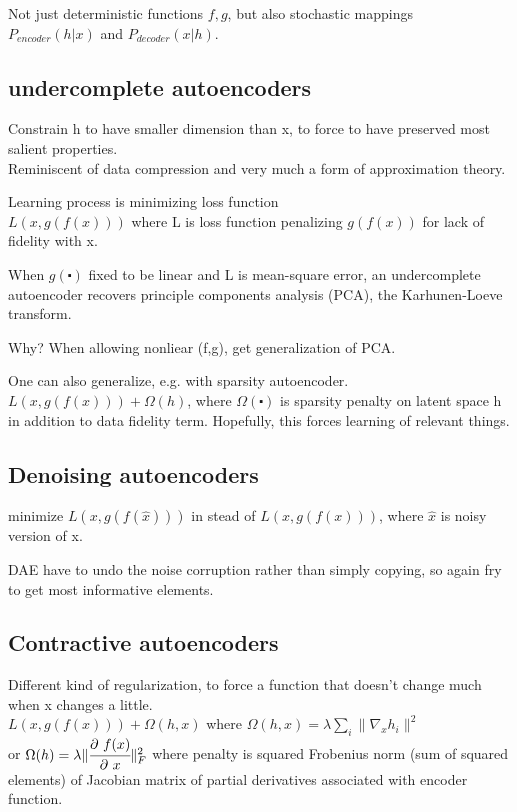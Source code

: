 \documentclass[12pt,a4paper]{article}
\begin{document}
Not just deterministic functions $f,g$, but also stochastic mappings \\
$P_{encoder}(h|x)$ and $P_{decoder}(x|h)$. 

\vspace{0.5cm}
\subsection{undercomplete autoencoders}
Constrain h to have smaller dimension than x, to force to have preserved most salient properties. \\
Reminiscent of data compression and very much a form of approximation theory. 

Learning process is minimizing loss function \\
$L(x, g(f(x)))$ where L is loss function penalizing $g(f(x))$ for lack of fidelity with x. 

When $g(\centerdot)$ fixed to be linear and L is mean-square error, an undercomplete autoencoder recovers principle components analysis (PCA), the Karhunen-Loeve transform. 

Why? When allowing nonliear (f,g), get generalization of PCA. 

One can also generalize, e.g. with sparsity autoencoder. \\
$L(x, g(f(x)))+\Omega(h)$, where $\Omega(\centerdot)$ is sparsity penalty on latent space h in addition to data fidelity term. Hopefully, this forces learning of relevant things. 

\subsection{Denoising autoencoders}
minimize $L(x, g(f(\hat{x})))$ in stead of $L(x, g(f(x)))$, where $\hat{x}$ is noisy version of x. 

DAE have to undo the noise corruption rather than simply copying, so again fry to get most informative elements. 

\subsection{Contractive autoencoders}
Different kind of regularization, to force a function that doesn't change much when x changes a little. \\
$L(x, g(f(x)))+\Omega(h, x)$ where $\Omega(h, x)=\lambda \sum_i\|\nabla_xh_i\|^2$\\ 
or $\Omega(h)=\lambda \|\cfrac{\partial\ f(x)}{\partial\ x}\|^2_F$ where penalty is squared Frobenius norm (sum of squared elements) of Jacobian matrix of partial derivatives associated with encoder function. 
\end{document}

